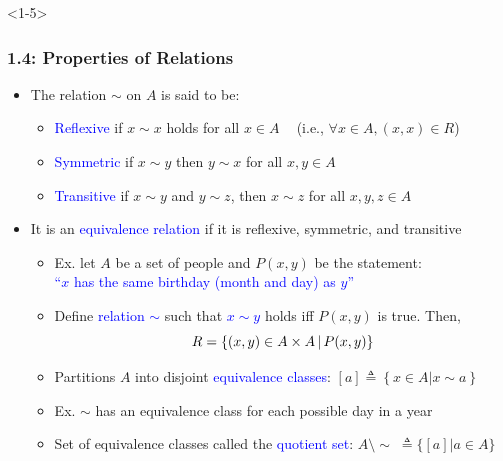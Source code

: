 \documentclass[10pt,english,aspectratio=169]{beamer}
\begin{document}
\begin{frame}<1-5> \frametitle{1.4: Properties of Relations}

\begin{itemize}
\setlength\itemsep{5mm}
\item<1-> The relation $\sim$ on $A$ is said to be: \vspace{1mm}
\begin{itemize}
  \setlength\itemsep{1.5mm}
  \item \textcolor{blue}{Reflexive} if $x\sim x$ holds for all $x\in A$ $\;\;$ (i.e., $\forall x\in A, (x,x) \in R$)
  \item \textcolor{blue}{Symmetric} if $x\sim y$ then $y\sim x$ for all $x,y\in A$
  \item \textcolor{blue}{Transitive} if $x\sim y$ and $y\sim z$, then $x\sim z$ for all $x,y,z\in A$
\end{itemize}

\item<2-> It is an \textcolor{blue}{equivalence relation} if it is reflexive, symmetric, and transitive \vspace{1mm}

\begin{itemize}
  \setlength\itemsep{1.5mm}
  \item Ex. let $A$ be a set of people and $P(x,y)$ be the statement: \\ \textcolor{blue}{``$x$ has the same birthday (month and day) as $y$''}
  \item Define \textcolor{blue}{relation $\sim$} such that \textcolor{blue}{$x\sim y$} holds iff $P(x,y)$ is true.  Then, \vspace{-1mm}
  \[ R = \{ (x,y)\in A\times A \,|\, P(x,y) \} \vspace*{-1mm} \]
  \item<3-> Partitions $A$ into disjoint \textcolor{blue}{equivalence classes}: $[a] \triangleq \left\{x\in A | x \sim a\right\}$
  \item<4-> Ex. $\sim$ has an equivalence class for each possible day in a year
  \item<5-> Set of equivalence classes called the \textcolor{blue}{quotient set}: $A \setminus \!\sim \;\triangleq \{ [a] | a\in A \}$

\end{itemize}
\end{itemize}


\end{frame}
\end{document}

